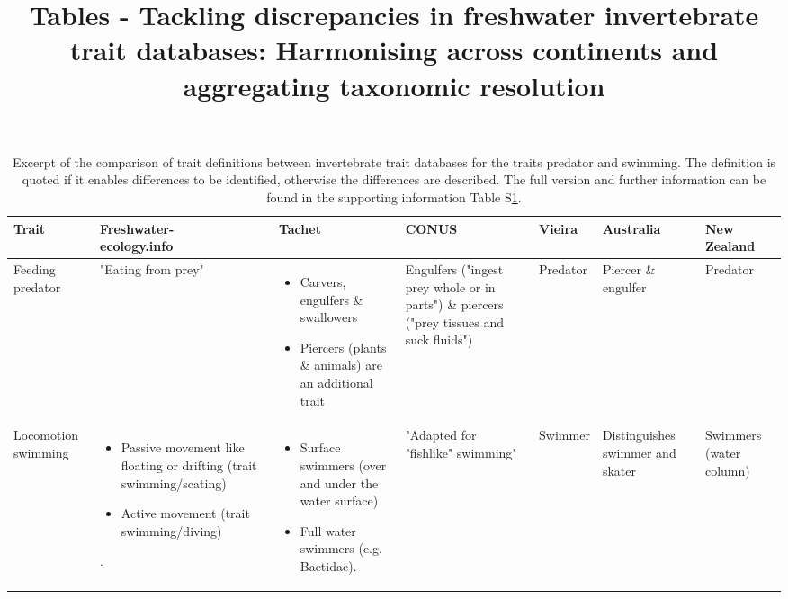 \documentclass[12pt]{article}
\title{Tables - Tackling discrepancies in freshwater invertebrate trait databases: Harmonising across continents and aggregating taxonomic resolution}
\author{}
\date{}
\makeatletter
\newcommand{\specialcell}[2][c]{%
  \begin{tabular}[#1]{@{}c@{}}#2\end{tabular}}
\makeatother
\begin{document}
\maketitle


\begin{landscape}
  \begin{longtable}{m{2.0cm}|m{3.5cm}|m{3.4cm}|m{4.2cm}|m{1.7cm}|m{2.5cm}|m{2.2cm}}
      \caption{Excerpt of the comparison of trait definitions between invertebrate trait databases for the traits predator and swimming. The definition is quoted if it enables differences to be identified, otherwise the differences are described. The full version and further information can be found in the supporting information Table S\ref{stab:trait_definitions}.}
      \label{stab:trait_definitions}
      \endfirsthead
      \toprule[.1em]
      Trait & \specialcell{Freshwater- \\ ecology.info} & Tachet & CONUS & Vieira & Australia & \specialcell{New \\ Zealand} \\
      \toprule[.1em]
      Feeding predator & 
        "Eating from prey" & 
        \begin{itemize}
            \item Carvers, engulfers \& swallowers
            \item Piercers (plants \& animals) are an additional trait
        \end{itemize} & %
        Engulfers ("ingest prey whole or in parts") \& 
        piercers ("prey tissues and suck fluids") & 
        Predator &
        Piercer \& engulfer &
        Predator
        \\ 
        \toprule[.1em]
        Locomotion swimming & 
        \begin{itemize}
            \item Passive movement like floating or drifting (trait swimming/scating)
            \item Active movement (trait swimming/diving)
        \end{itemize}. &
        \begin{itemize}
            \item Surface swimmers (over and under the water surface)
            \item Full water swimmers (e.g. Baetidae).
        \end{itemize} & 
        "Adapted for "fishlike" swimming" & 
        Swimmer & 
        Distinguishes swimmer and skater & 
        Swimmers (water column)
        \\
      \bottomrule
  \end{longtable}
\end{landscape}
\end{document}
